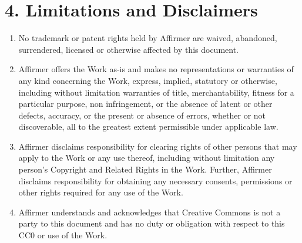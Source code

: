 \documentclass[a4paper,10pt,oneside]{book}
\begin{document}
\section*{4. Limitations and Disclaimers}

\begin{enumerate}[label=\alph*.]
	\item No trademark or patent rights held by Affirmer are waived, abandoned,
	surrendered, licensed or otherwise affected by this document.
	\item Affirmer offers the Work as-is and makes no representations or
	warranties of any kind concerning the Work, express, implied,
	statutory or otherwise, including without limitation warranties of
	title, merchantability, fitness for a particular purpose, non
	infringement, or the absence of latent or other defects, accuracy, or
	the present or absence of errors, whether or not discoverable, all to
	the greatest extent permissible under applicable law.
	\item Affirmer disclaims responsibility for clearing rights of other persons
	that may apply to the Work or any use thereof, including without
	limitation any person's Copyright and Related Rights in the Work.
	Further, Affirmer disclaims responsibility for obtaining any necessary
	consents, permissions or other rights required for any use of the
	Work.
	\item Affirmer understands and acknowledges that Creative Commons is not a
	party to this document and has no duty or obligation with respect to
	this CC0 or use of the Work.
\end{enumerate}
\end{document}
